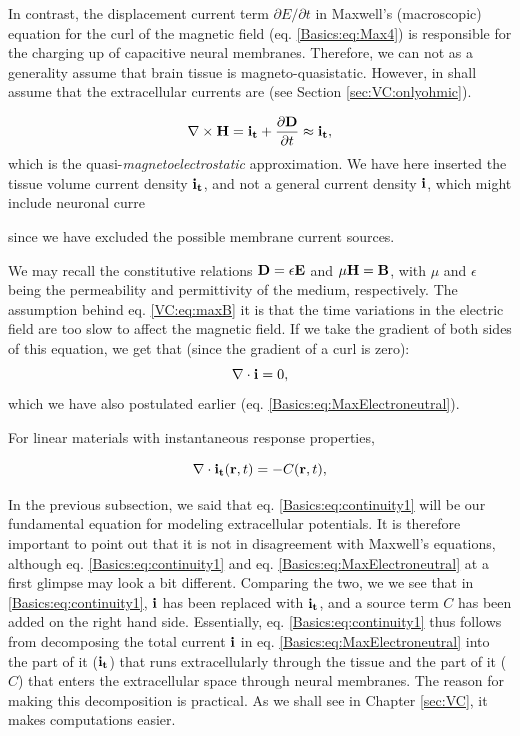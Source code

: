 In contrast, the displacement current term $\partial E/\partial t$ in Maxwell's (macroscopic) equation for the curl of the magnetic field (eq. \ref{Basics:eq:Max4}) is responsible for the charging up of capacitive neural membranes. Therefore, we can not as a generality assume that brain tissue is magneto-quasistatic. However, in shall assume that the extracellular currents are (see Section \ref{sec:VC:onlyohmic}).


\begin{equation}
\nabla \times {\bf H} = {\bf i_t} + \frac{\partial {\bf D}}{\partial t} \approx {\bf i_t},
\label{VC:eq:maxB}
\end{equation}
which is the quasi-\textit{magnetoelectrostatic} approximation. We have here inserted the tissue volume current density ${\bf i_t}$, and not a general current density ${\bf i}$, which might include neuronal curre

since we have excluded the possible membrane current sources.

We may recall the constitutive relations ${\bf D} = \epsilon{\bf E}$ and $\mu{\bf H} = {\bf B}$, with $\mu$ and $\epsilon$ being the permeability and permittivity of the medium, respectively. The assumption behind eq. \ref{VC:eq:maxB} it is that the time variations in the electric field are too slow to affect the magnetic field. If we take the gradient of both sides of this equation, we get that (since the gradient of a curl is zero): 
\begin{equation}
\nabla\cdot {\bf i} = 0, 
\label{VC:eq:maxBstatic}
\end{equation}
which we have also postulated earlier (eq. \ref{Basics:eq:MaxElectroneutral}). 

 For linear materials with instantaneous response properties, 



\begin{equation}
\nabla \cdot {\bf i_t}({\bf r}, t) = - C({\bf r}, t),
\label{VC:eq:CSD1}
\end{equation}


In the previous subsection, we said that eq. \ref{Basics:eq:continuity1} will be our fundamental equation for modeling extracellular potentials. It is therefore important to point out that it is not in disagreement with Maxwell's equations, although eq. \ref{Basics:eq:continuity1} and eq. \ref{Basics:eq:MaxElectroneutral} at a first glimpse may look a bit different. Comparing the two, we we see that in \ref{Basics:eq:continuity1}, ${\bf i}$ has been replaced with ${\bf i_t}$, and a source term $C$ has been added on the right hand side. Essentially, eq. \ref{Basics:eq:continuity1} thus follows from decomposing the total current ${\bf i}$ in eq. \ref{Basics:eq:MaxElectroneutral} into the part of it ($\bf{i_t}$) that runs extracellularly through the tissue and the part of it ($C$) that enters the extracellular space through neural membranes. The reason for making this decomposition is practical. As we shall see in Chapter \ref{sec:VC}, it makes computations easier.


